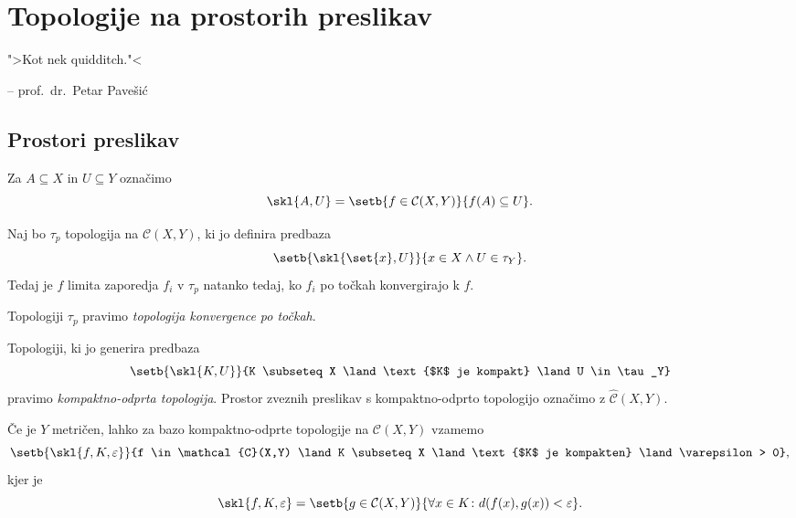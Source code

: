 \section{Topologije na prostorih preslikav}

\epigraph{">Kot nek quidditch."<}{-- prof.~dr.~Petar Pavešić}


\subsection{Prostori preslikav}

\begin{definicija}
Za $A \subseteq X$ in $U \subseteq Y$ označimo
\[
\skl{A,U} = \setb{f \in \mathcal{C}(X,Y)}{f(A) \subseteq U}.
\]
\end{definicija}

\begin{trditev}
Naj bo $\tau_p$ topologija na $\mathcal{C}(X,Y)$, ki jo definira
predbaza
\[
\setb{\skl{\set{x},U}}{x \in X \land U \in \tau_Y}.
\]
Tedaj je $f$ limita zaporedja $f_i$ v $\tau_p$ natanko tedaj, ko
$f_i$ po točkah konvergirajo k $f$.
\end{trditev}

\obvs

\begin{opomba}
Topologiji $\tau_p$ pravimo
\emph{topologija konvergence po točkah}.
\end{opomba}

\begin{definicija}
Topologiji, ki jo generira predbaza
\[
\setb{\skl{K,U}}
{K \subseteq X \land \text{$K$ je kompakt} \land U \in \tau_Y}
\]
pravimo
\emph{kompaktno-odprta topologija}.
Prostor zveznih preslikav s kompaktno-odprto topologijo označimo z
$\widehat{\mathcal{C}}(X,Y)$.
\end{definicija}

\begin{trditev}
Če je $Y$ metričen, lahko za bazo kompaktno-odprte topologije na
$\mathcal{C}(X,Y)$ vzamemo
\[
\setb{\skl{f,K,\varepsilon}}
{f \in \mathcal{C}(X,Y) \land K \subseteq X
\land \text{$K$ je kompakten} \land \varepsilon > 0},
\]
kjer je
\[
\skl{f,K,\varepsilon} =
\setb{g \in \mathcal{C}(X,Y)}
{\forall x \in K \colon d(f(x),g(x)) < \varepsilon}.
\]
\end{trditev}

